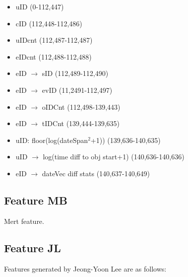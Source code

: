 \begin{itemize}
  \setlength\itemsep{0em}
  \item uID (0-112,447)
  \item cID (112,448-112,486)
  \item uIDcnt (112,487-112,487)
  \item eIDcnt (112,488-112,488)
  \item eID $\rightarrow$ sID (112,489-112,490)
  \item eID $\rightarrow$ evID (11,2491-112,497)
  \item eID $\rightarrow$ oIDCnt (112,498-139,443)
  \item eID $\rightarrow$ tIDCnt (139,444-139,635)
  \item uID: floor(log(dateSpan$^2$+1)) (139,636-140,635)
  \item uID $\rightarrow$ log(time diff to obj start+1) (140,636-140,636)
  \item eID $\rightarrow$ dateVec diff stats (140,637-140,649)
\end{itemize}

\subsection{Feature MB}
Mert feature.

\subsection{Feature JL}
Features generated by Jeong-Yoon Lee are as follows:

